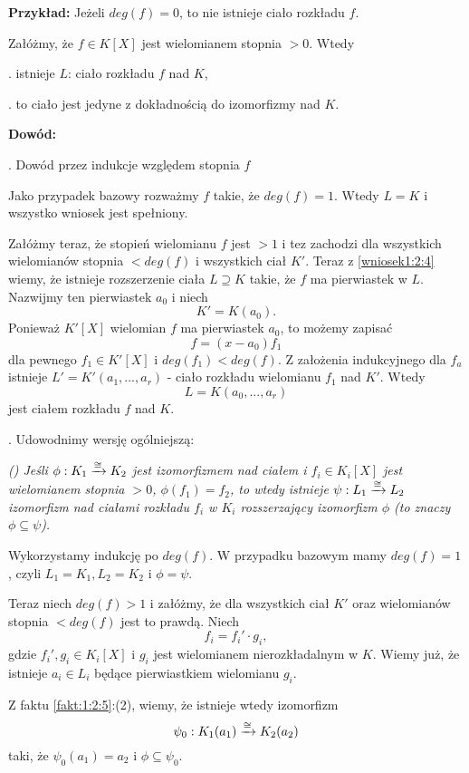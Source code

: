 \textbf{Przykład:} Jeżeli $deg(f)=0$, to nie istnieje ciało rozkładu $f$.

\begin{wniosek}
    Załóżmy, że $f\in K[X]$ jest wielomianem stopnia $>0$. Wtedy

. istnieje $L$: ciało rozkładu $f$ nad $K$,

. to ciało jest jedyne z dokładnością do izomorfizmy nad $K$.
\end{wniosek}

\textbf{Dowód:}

. Dowód przez indukcje względem stopnia $f$

Jako przypadek bazowy rozważmy $f$ takie, że $deg(f)=1$. Wtedy $L=K$ i wszystko wniosek jest spełniony.

Załóżmy teraz, że stopień wielomianu $f$ jest $>1$ i tez zachodzi dla wszystkich wielomianów stopnia $<deg(f)$ i wszystkich ciał $K'$. Teraz z \ref{wniosek1:2:4} wiemy, że istnieje rozszerzenie ciała $L\supseteq K$ takie, że $f$ ma pierwiastek w $L$. Nazwijmy ten pierwiastek $a_0$ i niech
$$K'=K(a_0).$$
Ponieważ $K'[X]$ wielomian $f$ ma pierwiastek $a_0$, to możemy zapisać
$$f=(x-a_0)f_1$$
dla pewnego $f_1\in K'[X]$ i $deg(f_1)<deg(f)$. Z założenia indukcyjnego dla $f_a$ istnieje $L'=K'(a_1,...,a_r)$ - ciało rozkładu wielomianu $f_1$ nad $K'$. Wtedy 
$$L=K(a_0,...,a_r)$$
jest ciałem rozkładu $f$ nad $K$.

. Udowodnimy wersję ogólniejszą: 
\label{stwierdzenie:wniosek}

\emph{(\bat) Jeśli $\phi:K_1\xrightarrow[]{\cong} K_2$ jest izomorfizmem nad ciałem i $f_i\in K_i[X]$ jest wielomianem stopnia $>0$, $\phi(f_1)=f_2$, to wtedy istnieje $ \psi:L_1\xrightarrow[]{\cong} L_2$ izomorfizm nad ciałami rozkładu $f_i$ w $K_i$ rozszerzający izomorfizm $\phi$ (to znaczy $\phi\subseteq \psi$).}

Wykorzystamy indukcję po $deg(f)$. W przypadku bazowym mamy $deg(f)=1$, czyli $L_1=K_1,L_2=K_2$ i $\phi=\psi$.

Teraz niech $deg(f)>1$ i załóżmy, że dla wszystkich ciał $K'$ oraz wielomianów stopnia $<deg(f)$ jest to prawdą. Niech
$$f_i=f_i'\cdot g_i,$$
gdzie $f_i',g_i\in K_i[X]$ i $g_i$ jest wielomianem nierozkładalnym w $K$. Wiemy już, że istnieje $a_i\in L_i$ będące pierwiastkiem wielomianu $g_i$.

Z faktu \ref{fakt:1:2:5}:(2), wiemy, że istnieje wtedy izomorfizm
$$\psi_0:K_1(a_1)\xrightarrow[]{\cong}K_2(a_2)$$
taki, że $\psi_0(a_1)=a_2$ i $\phi\subseteq\psi_0$.

